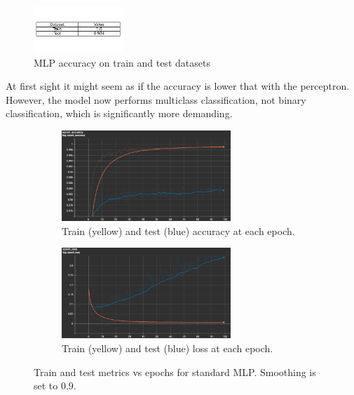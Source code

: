 \documentclass{article}
\begin{document}
\begin{figure}[h!]
    \centering
    \includegraphics[width=0.3\textwidth]{./plots/plot10.png}  %
    \caption{MLP accuracy on train and test datasets}
    \label{fig:plot8}  %
\end{figure}

At first sight it might seem as if the accuracy is lower that with the perceptron.
However, the model now performs multiclass classification, not binary classification, which is significantly more demanding.

\begin{figure}[h!]
    \centering
    \begin{subfigure}[t]{\textwidth}
        \centering
        \includegraphics[width=0.7\textwidth]{./plots/screenshot1.png} %
        \caption{Train (yellow) and test (blue) accuracy at each epoch.}
        \label{fig:fig91}
    \end{subfigure}
    \vspace{0.2cm}
    \begin{subfigure}[t]{\textwidth}
        \centering
        \includegraphics[width=0.7\textwidth]{./plots/screenshot2.png} %
        \caption{Train (yellow) and test (blue) loss at each epoch.}
        \label{fig:fig92}
    \end{subfigure}
    \caption{Train and test metrics vs epochs for standard MLP. Smoothing is set to 0.9.}
    \label{fig:plot9}
\end{figure}
\end{document}
